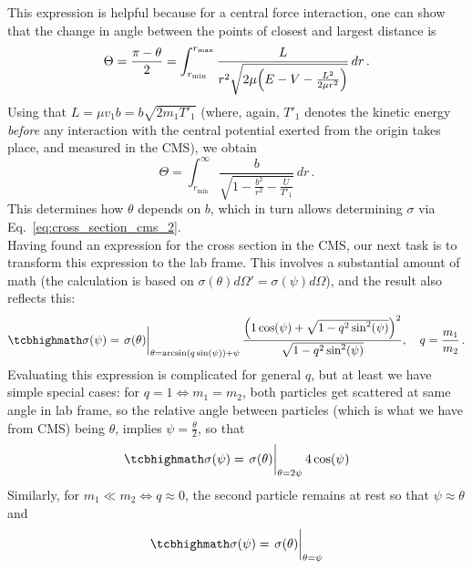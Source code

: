 \documentclass[../class_mech_main.tex]{subfiles}
\begin{document}
This expression is helpful because for a central force interaction, one can show that the change in angle between the points of closest and largest distance is
\begin{equation}
	\Theta = \frac{\pi - \theta}{2} = \int_{r_\mathrm{min}}^{r_\mathrm{max}} \frac{L}{r^2 \sqrt{2 \mu \qty(E - V - \frac{L^2}{2 \mu r^2})}} \, dr
	\, .
\end{equation}
Using that $L = \mu v_1 b = b \sqrt{2 m_1 T'_1}$ (where, again, $T'_1$ denotes the kinetic energy \emph{before} any interaction with the central potential exerted from the origin takes place, and measured in the CMS), we obtain
\begin{equation}\label{eq:angle_as_func_of_b}
	\Theta = \int_{r_\mathrm{min}}^{\infty} \frac{b}{\sqrt{1 - \frac{b^2}{r^2} - \frac{U}{T'_1}}} \, dr
	\, .
\end{equation}
This determines how $\theta$ depends on $b$, which in turn allows determining $\sigma$ via Eq.~\eqref{eq:cross_section_cms_2}.\\


Having found an expression for the cross section in the CMS, our next task is to transform this expression to the lab frame. This involves a substantial amount of math (the calculation is based on $\sigma(\theta) d\Omega' = \sigma(\psi) d\Omega$), and the result also reflects this:
\begin{equation}\label{eq:cross_section_general}
	\eqbox{
		\sigma(\psi) = \eval{\sigma(\theta)}_{\theta = \arcsin(q \sin(\psi)) + \psi} \frac{\qty(1 \cos(\psi) + \sqrt{1 - q^2\sin[2](\psi)})^2}{\sqrt{1 - q^2\sin[2](\psi)}}
		, \quad q = \frac{m_1}{m_2}
	}
	\, .
\end{equation}
Evaluating this expression is complicated for general $q$, but at least we have simple special cases: for $q = 1 \Leftrightarrow m_1 = m_2$, both particles get scattered at same angle in lab frame, so the relative angle between particles (which is what we have from CMS) being $\theta$, implies $\psi = \frac{\theta}{2}$, so that
\begin{equation}\label{eq:cross_section_q1}
	\eqbox{
		\sigma(\psi) = \eval{\sigma(\theta)}_{\theta = 2\psi} 4 \cos(\psi)
	}
\end{equation}
Similarly, for $m_1 \ll m_2 \Leftrightarrow q \approx 0$, the second particle remains at rest so that $\psi \approx \theta$ and
\begin{equation}\label{eq:cross_section_q0}
	\eqbox{
		\sigma(\psi) = \eval{\sigma(\theta)}_{\theta = \psi}
	}
\end{equation}
\end{document}
